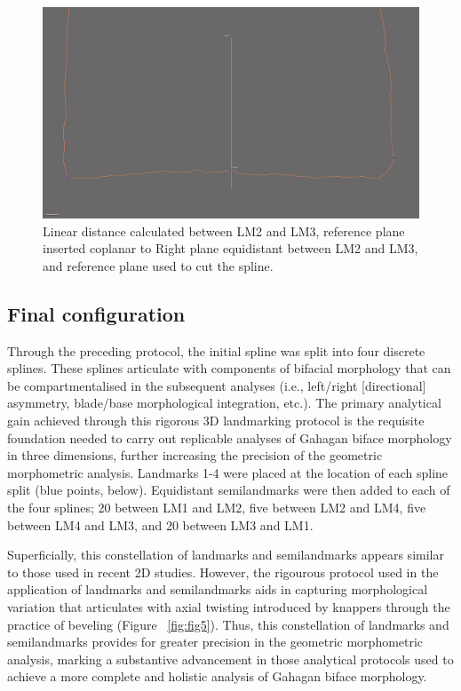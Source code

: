 \documentclass[review]{elsarticle}
\begin{document}
\begin{figure}[ht]\centering
\includegraphics[width=\linewidth]{analysis/images/lm4.pdf}
\caption{Linear distance calculated between LM2 and LM3, reference plane inserted coplanar to Right plane equidistant between LM2 and LM3, and reference plane used to cut the spline.}
\label{fig:fig-splinesplit}
\end{figure}

\subsection*{Final configuration}

Through the preceding protocol, the initial spline was split into four discrete splines. These splines articulate with components of bifacial morphology that can be compartmentalised in the subsequent analyses (i.e., left/right [directional] asymmetry, blade/base morphological integration, etc.). The primary analytical gain achieved through this rigorous 3D landmarking protocol is the requisite foundation needed to carry out replicable analyses of Gahagan biface morphology in three dimensions, further increasing the precision of the geometric morphometric analysis. Landmarks 1-4 were placed at the location of each spline split (blue points, below). Equidistant semilandmarks were then added to each of the four splines; 20 between LM1 and LM2, five between LM2 and LM4, five between LM4 and LM3, and 20 between LM3 and LM1.

Superficially, this constellation of landmarks and semilandmarks appears similar to those used in recent 2D studies. However, the rigourous protocol used in the application of landmarks and semilandmarks aids in capturing morphological variation that articulates with axial twisting introduced by knappers through the practice of beveling (Figure ~\ref{fig:fig5}). Thus, this constellation of landmarks and semilandmarks provides for greater precision in the geometric morphometric analysis, marking a substantive advancement in those analytical protocols used to achieve a more complete and holistic analysis of Gahagan biface morphology.
\end{document}
